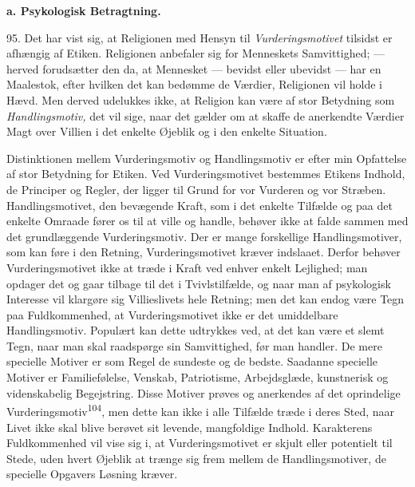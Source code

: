 \documentclass[12pt,a4paper,openany]{book}
\newcommand{\opage}[1]{\marginnote{\footnotesize\textit{[#1]}}}
\begin{document}
\begin{center}\textbf{a. Psykologisk Betragtning.}\end{center}

95. Det har vist sig, at Religionen med Hensyn til
\textit{Vurderingsmotivet} tilsidst er afhængig af Etiken. Religionen
anbefaler sig for Menneskets Samvittighed; --- herved forudsætter den
da, at Mennesket --- bevidst eller ubevidst --- har en Maalestok, efter
hvilken det kan bedømme de Værdier, Religionen vil holde i Hævd. Men
derved udelukkes ikke, at Religion kan være af stor Betydning som
\textit{Handlingsmotiv,} det vil sige, naar det gælder om at skaffe de
anerkendte Værdier Magt over Villien i det enkelte Øjeblik og i den
enkelte Situation.

Distinktionen mellem Vurderingsmotiv og Handlingsmotiv er efter min
Opfattelse af stor Betydning for Etiken. Ved Vurderingsmotivet bestemmes
Etikens Indhold, de Principer og Regler, der ligger til Grund for vor
Vurderen og vor Stræben. Handlingsmotivet, den bevægende Kraft, som i
det enkelte Tilfælde og paa det enkelte Omraade fører os til at ville og
handle, behøver ikke at falde sammen med det grundlæggende
Vurderingsmotiv. Der er mange forskellige Handlingsmotiver, som kan føre
i den Retning, Vurderingsmotivet kræver indslaaet. Derfor behøver
Vurderingsmotivet ikke at træde i Kraft ved enhver enkelt Lejlighed; man
opdager det og gaar tilbage til det i Tvivlstilfælde, og naar man af
psykologisk Interesse vil klargøre sig
\opage{218}Villieslivets hele Retning; men det kan endog være Tegn paa
Fuldkommenhed, at Vurderingsmotivet ikke er det umiddelbare
Handlingsmotiv. Populært kan dette udtrykkes ved, at det kan være et
slemt Tegn, naar man skal raadspørge sin Samvittighed, før man handler.
De mere specielle Motiver er som Regel de sundeste og de bedste.
Saadanne specielle Motiver er Familiefølelse, Venskab, Patriotisme,
Arbejdsglæde, kunstnerisk og videnskabelig Begejstring. Disse Motiver
prøves og anerkendes af det oprindelige
Vurderingsmotiv\textsuperscript{104}, men dette kan ikke i alle Tilfælde
træde i deres Sted, naar Livet ikke skal blive berøvet sit levende,
mangfoldige Indhold. Karakterens Fuldkommenhed vil vise sig i, at
Vurderingsmotivet er skjult eller potentielt til Stede, uden hvert
Øjeblik at trænge sig frem mellem de Handlingsmotiver, de specielle
Opgavers Løsning kræver.
\end{document}
